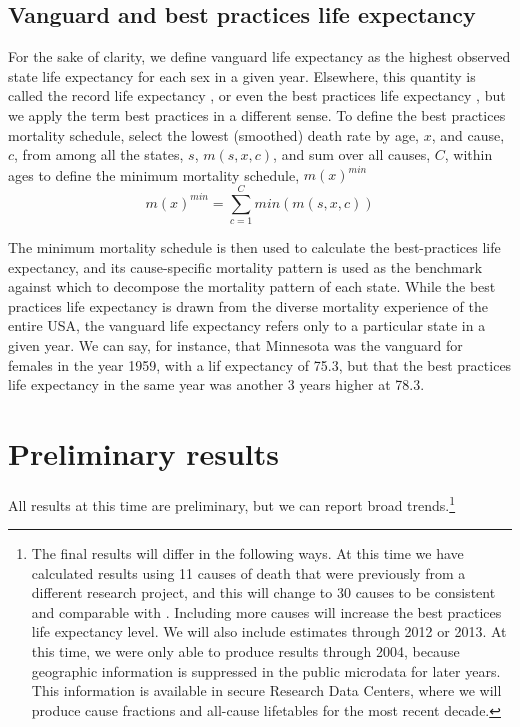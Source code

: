 \documentclass[11pt,oneside,a4paper]{article} %
\begin{document}
\subsection{Vanguard and best practices life expectancy}
For the sake of clarity, we define vanguard life expectancy as the highest
observed state life expectancy for each sex in a given year. Elsewhere, this
quantity is called the record life expectancy \citep{oeppen2002broken}, or even
the best practices life expectancy \citep{sanderson2004putting}, but we apply
the term best practices in a different sense. To define the best practices
mortality schedule, select the lowest (smoothed) death rate by age, $x$,
and cause, $c$, from among all the states, $s$, $m(s,x,c)$, and sum over
all causes, $C$, within ages to define the minimum mortality schedule,
$m(x)^{min}$
\begin{equation}
m(x)^{min} = \sum _{c=1}^C min(m(s,x,c))
\end{equation}

The minimum mortality schedule is then used to calculate the best-practices life
expectancy, and its cause-specific mortality pattern is used as the
benchmark against which to decompose the mortality pattern of each state. While
the best practices life expectancy is drawn from the diverse mortality
experience of the entire USA, the vanguard life expectancy refers only to a
particular state in a given year. We can say, for instance, that Minnesota was
the vanguard for females in the year 1959, with a lif expectancy of 75.3, but
that the best practices life expectancy in the same year was another 3 years
higher at 78.3.

\FloatBarrier
\section*{Preliminary results}
\FloatBarrier

All results at this time are preliminary, but we can report broad trends.\footnote{The final results will differ in the following ways. At this time we have
calculated results using 11 causes of death that were previously from a
different research project, and this will change to 30 causes to be consistent and comparable with \citet{vallin2008minimum}. Including
more causes will increase the best practices life expectancy level. We will also
include estimates through 2012 or 2013. At this time, we were only able to
produce results through 2004, because geographic information is suppressed in
the public microdata for later years. This information is available in secure
Research Data Centers, where we will produce cause fractions and all-cause lifetables for
the most recent decade.} 
\end{document}
